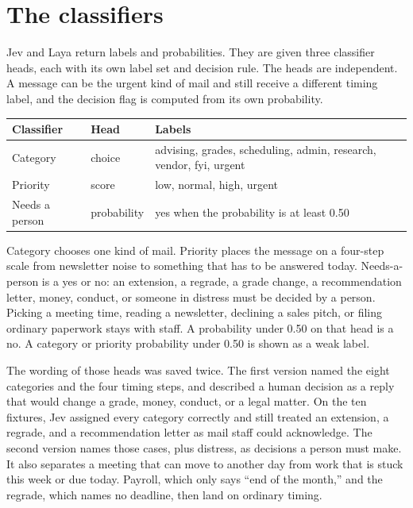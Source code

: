 \documentclass[11pt,a4paper]{article}
\begin{document}
\section{The classifiers}

Jev and Laya return labels and probabilities. They are given three classifier heads, each with its own label set and decision rule. The heads are independent. A message can be the urgent kind of mail and still receive a different timing label, and the decision flag is computed from its own probability.

\begin{center}
\small
\begin{tabularx}{\textwidth}{@{}l l X@{}}
\toprule
\textbf{Classifier} & \textbf{Head} & \textbf{Labels} \\
\midrule
Category & choice & advising, grades, scheduling, admin, research, vendor, fyi, urgent \\
Priority & score & low, normal, high, urgent \\
Needs a person & probability & yes when the probability is at least 0.50 \\
\bottomrule
\end{tabularx}
\end{center}

Category chooses one kind of mail. Priority places the message on a four-step scale from newsletter noise to something that has to be answered today. Needs-a-person is a yes or no: an extension, a regrade, a grade change, a recommendation letter, money, conduct, or someone in distress must be decided by a person. Picking a meeting time, reading a newsletter, declining a sales pitch, or filing ordinary paperwork stays with staff. A probability under 0.50 on that head is a no. A category or priority probability under 0.50 is shown as a weak label.

The wording of those heads was saved twice. The first version named the eight categories and the four timing steps, and described a human decision as a reply that would change a grade, money, conduct, or a legal matter. On the ten fixtures, Jev assigned every category correctly and still treated an extension, a regrade, and a recommendation letter as mail staff could acknowledge. The second version names those cases, plus distress, as decisions a person must make. It also separates a meeting that can move to another day from work that is stuck this week or due today. Payroll, which only says ``end of the month,'' and the regrade, which names no deadline, then land on ordinary timing.
\end{document}
